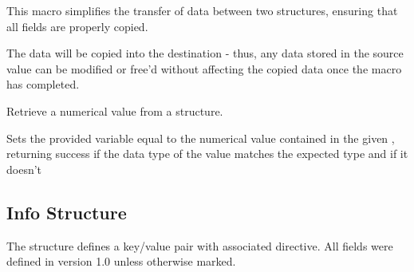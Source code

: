 
\begin{arglist}
\end{arglist}

This macro simplifies the transfer of data between two  structures, ensuring that all fields are properly copied.

\adviceuserstart
The data will be copied into the destination  - thus, any data stored in the source value can be modified or free'd without affecting the copied data once the macro has completed.
\adviceuserend


Retrieve a numerical value from a  structure.


\begin{arglist}
\end{arglist}

Sets the provided variable equal to the numerical value contained in the given , returning success if the data type of the value matches the expected type and  if it doesn't

\subsection{Info Structure}
\label{chap:struct:info}

The  structure defines a key/value pair with associated directive. All fields were defined in version 1.0 unless otherwise marked.


